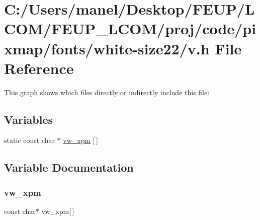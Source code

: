 \hypertarget{white-size22_2v_8h}{}\section{C\+:/\+Users/manel/\+Desktop/\+F\+E\+U\+P/\+L\+C\+O\+M/\+F\+E\+U\+P\+\_\+\+L\+C\+O\+M/proj/code/pixmap/fonts/white-\/size22/v.h File Reference}
\label{white-size22_2v_8h}
This graph shows which files directly or indirectly include this file\+:
\subsection*{Variables}
\begin{DoxyCompactItemize}
\item 
static const char $\ast$ \mbox{\hyperlink{white-size22_2v_8h_acdcd4488ae68c321f3803ad4f48e282b}{vw\+\_\+xpm}} \mbox{[}$\,$\mbox{]}
\end{DoxyCompactItemize}


\subsection{Variable Documentation}
\mbox{\label{white-size22_2v_8h_acdcd4488ae68c321f3803ad4f48e282b}} 
\subsubsection{\texorpdfstring{vw\_xpm}{vw\_xpm}}
{\footnotesize\ttfamily const char$\ast$ vw\+\_\+xpm\mbox{[}$\,$\mbox{]}\hspace{0.3cm}{\ttfamily [static]}}

